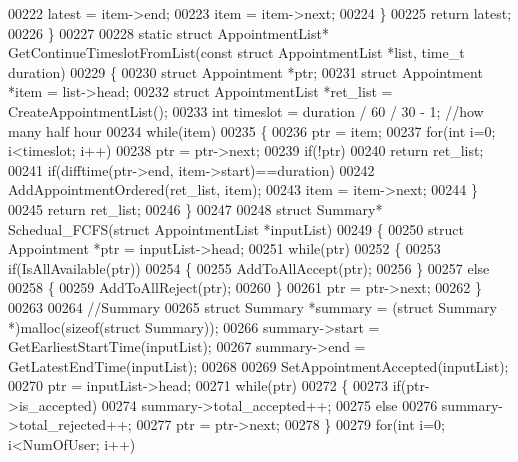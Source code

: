 \begin{DoxyCode}
00222             latest = item->end;
00223         item = item->next;
00224     \}
00225     \textcolor{keywordflow}{return} latest;
00226 \}
00227 
00228 \textcolor{keyword}{static} \textcolor{keyword}{struct }AppointmentList* GetContinueTimeslotFromList(\textcolor{keyword}{const} \textcolor{keyword}{struct} 
      AppointmentList *list, time\_t duration)
00229 \{
00230     \textcolor{keyword}{struct }Appointment *ptr;
00231     \textcolor{keyword}{struct }Appointment *item = list->head;
00232     \textcolor{keyword}{struct }AppointmentList *ret\_list = CreateAppointmentList();
00233     \textcolor{keywordtype}{int} timeslot = duration / 60 / 30 - 1;  \textcolor{comment}{//how many half hour}
00234     \textcolor{keywordflow}{while}(item)
00235     \{
00236         ptr = item;
00237         \textcolor{keywordflow}{for}(\textcolor{keywordtype}{int} i=0; i<timeslot; i++)
00238             ptr = ptr->next;
00239         \textcolor{keywordflow}{if}(!ptr)
00240             \textcolor{keywordflow}{return} ret\_list;
00241         \textcolor{keywordflow}{if}(difftime(ptr->end, item->start)==duration)
00242             AddAppointmentOrdered(ret\_list, item);
00243         item = item->next;
00244     \}
00245     \textcolor{keywordflow}{return} ret\_list;
00246 \}
00247 
00248 \textcolor{keyword}{struct }Summary* Schedual_FCFS(\textcolor{keyword}{struct} AppointmentList *inputList)
00249 \{
00250     \textcolor{keyword}{struct }Appointment *ptr = inputList->head;
00251     \textcolor{keywordflow}{while}(ptr)
00252     \{
00253         \textcolor{keywordflow}{if}(IsAllAvailable(ptr))
00254         \{
00255             AddToAllAccept(ptr);
00256         \}
00257         \textcolor{keywordflow}{else}
00258         \{
00259             AddToAllReject(ptr);
00260         \}
00261         ptr = ptr->next;
00262     \}
00263 
00264     \textcolor{comment}{//Summary}
00265     \textcolor{keyword}{struct }Summary *summary = (\textcolor{keyword}{struct }Summary *)malloc(\textcolor{keyword}{sizeof}(\textcolor{keyword}{struct} Summary));
00266     summary->start = GetEarliestStartTime(inputList);
00267     summary->end = GetLatestEndTime(inputList);
00268     
00269     SetAppointmentAccepted(inputList);
00270     ptr = inputList->head;
00271     \textcolor{keywordflow}{while}(ptr)
00272     \{
00273         \textcolor{keywordflow}{if}(ptr->is_accepted)
00274             summary->total_accepted++;
00275         \textcolor{keywordflow}{else}
00276             summary->total_rejected++;
00277         ptr = ptr->next;
00278     \}
00279     \textcolor{keywordflow}{for}(\textcolor{keywordtype}{int} i=0; i<NumOfUser; i++)

\end{DoxyCode}
